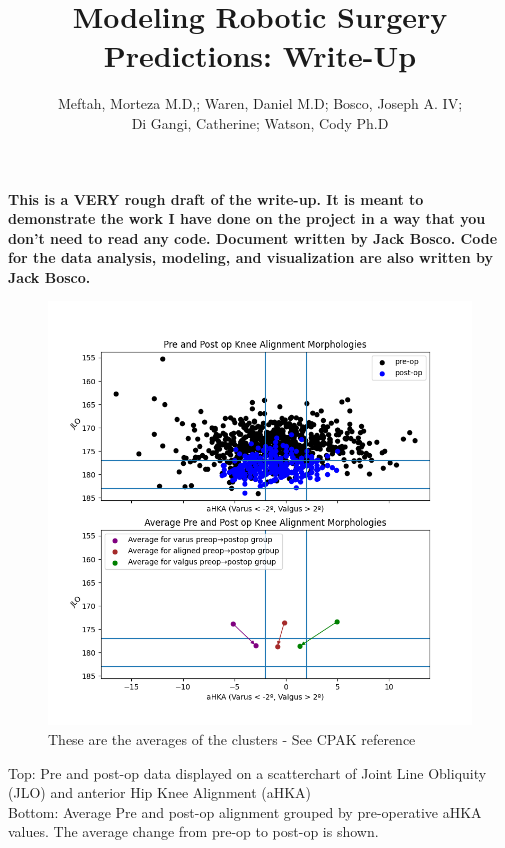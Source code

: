 \documentclass{article}
\author{Meftah, Morteza M.D,; Waren, Daniel M.D; Bosco, Joseph A. IV;\\
Di Gangi, Catherine; Watson, Cody Ph.D}
\title{Modeling Robotic Surgery Predictions: Write-Up}
\begin{document}
\maketitle

\textbf{%
This is a VERY rough draft of the write-up. 
It is meant to demonstrate the work I have done on the project in a way that you don't need to read any code.
Document written by Jack Bosco. 
Code for the data analysis, modeling, and visualization are also written by Jack Bosco. 
}

\newpage

\begin{figure}[t]
\includegraphics[width=.9\textwidth]{data_vis.png}
\caption{These are the averages of the clusters - See CPAK reference}
\end{figure}

Top: Pre and post-op data displayed on a scatterchart of Joint Line Obliquity (JLO) and anterior Hip Knee Alignment (aHKA)\\
Bottom: Average Pre and post-op alignment grouped by pre-operative aHKA values.
The average change from pre-op to post-op is shown.

\newpage
\end{document}
